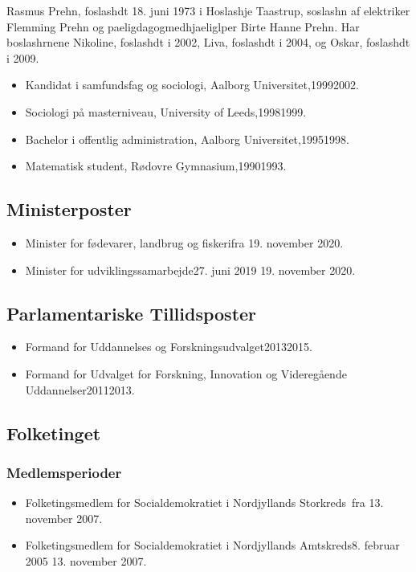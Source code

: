 \documentclass[11pt, a4paper]{awesome-cv}
\begin{document}
\makecvheader[R]
\makelettertitle
\begin{cvletter}
Rasmus Prehn, foslashdt 18. juni 1973 i Hoslashje Taastrup, soslashn af elektriker Flemming Prehn og paeligdagogmedhjaeliglper Birte Hanne Prehn. Har boslashrnene Nikoline, foslashdt i 2002, Liva, foslashdt i 2004, og Oskar, foslashdt i 2009.

\begin{itemize}
\item Kandidat i samfundsfag og sociologi, Aalborg Universitet,19992002.
\item Sociologi på masterniveau, University of Leeds,19981999.
\item Bachelor i offentlig administration, Aalborg Universitet,19951998.
\item Matematisk student, Rødovre Gymnasium,19901993.
\end{itemize}
\subsection*{Ministerposter}
\begin{itemize}
\item Minister for fødevarer, landbrug og fiskerifra 19. november 2020.
\item Minister for udviklingssamarbejde27. juni 2019  19. november 2020.
\end{itemize}
\subsection*{Parlamentariske Tillidsposter}
\begin{itemize}
\item Formand for Uddannelses og Forskningsudvalget20132015.
\item Formand for Udvalget for Forskning, Innovation og Videregående Uddannelser20112013.
\end{itemize}
\subsection*{Folketinget}
\subsubsection*{Medlemsperioder}
\begin{itemize}
\item Folketingsmedlem for Socialdemokratiet i Nordjyllands Storkreds fra 13. november 2007.
\item Folketingsmedlem for Socialdemokratiet i Nordjyllands Amtskreds8. februar 2005  13. november 2007.
\end{itemize}

\end{cvletter}
\end{document}
